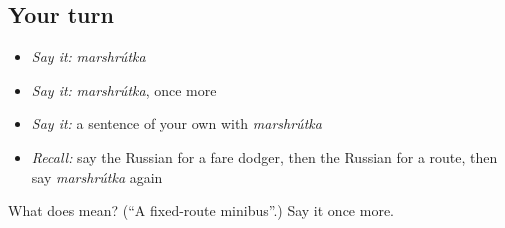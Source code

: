 \subsection*{Your turn}
\begin{itemize}
\raggedright
  \item \emph{Say it:} \emph{marshrútka}
  \item \emph{Say it:} \emph{marshrútka}, once more
  \item \emph{Say it:} a sentence of your own with \emph{marshrútka}
  \item \emph{Recall:} say the Russian for a fare dodger, then the Russian for a route, then say \emph{marshrútka} again
\end{itemize}

\begin{tcolorbox}[breakable,colback=teal!4,colframe=teal!35!black,title={Before you move on}]
What does  mean? (\textquotedblleft{}A fixed-route minibus\textquotedblright{}.) Say it once more.
\end{tcolorbox}

